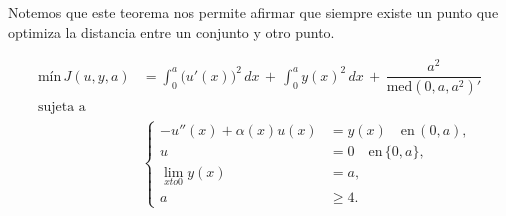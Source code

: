 \documentclass[11pt, a4paper]{article} %
\begin{document}
Notemos que este teorema nos permite afirmar que siempre existe un punto que optimiza la distancia entre un conjunto y otro punto.

\newpage

\begin{align}
\text{mín} \, J(u,y,a)
		&=
	\int_0^a  \big( u'(x) \big)  ^2 \, dx \, + \, \int_0^a  y(x)^2 \, dx \, + \, \dfrac{a^2}{\text{med}(0,a,a^2)'} 
	\\
\text{sujeta a} \nonumber
    \\
     	&\left\{ \begin{aligned}
       		-u''(x)+ \alpha(x)u(x) &= y(x) \quad \text{en} \, (0,a), 
       		\\
      		 u &= 0 \quad \text{en} \, \{0,a\}, 
       		\\ 
       		\lim_{x to 0} y(x) &= a, 
       		\\
       		a &\geq 4.
    	\end{aligned}
    	\right.
\end{align}
\end{document}
